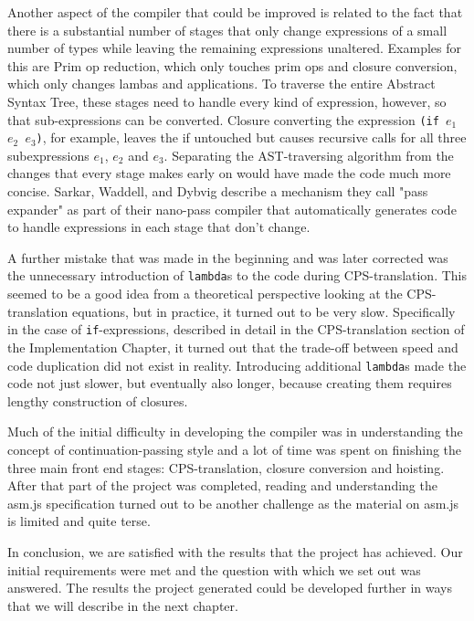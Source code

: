\documentclass[11pt]{report}
\begin{document}
Another aspect of the compiler that could be improved is related to the fact that there is a substantial number of stages that only change expressions of a small number of types while leaving the remaining expressions unaltered. Examples for this are Prim op reduction, which only touches prim ops and closure conversion, which only changes lambas and applications. To traverse the entire Abstract Syntax Tree, these stages need to handle every kind of expression, however, so that sub-expressions can be converted. Closure converting the expression \texttt{(if $e_1$ $e_2$ $e_3$)}, for example, leaves the if untouched but causes recursive calls for all three subexpressions $e_1$, $e_2$ and $e_3$. Separating the AST-traversing algorithm from the changes that every stage makes early on would have made the code much more concise. Sarkar, Waddell, and Dybvig describe \cite{nanopass} a mechanism they call "pass expander" as part of their nano-pass compiler that automatically generates code to handle expressions in each stage that don't change.

A further mistake that was made in the beginning and was later corrected was the unnecessary introduction of \texttt{lambda}s to the code during CPS-translation. This seemed to be a good idea from a theoretical perspective looking at the CPS-translation equations, but in practice, it turned out to be very slow. Specifically in the case of \texttt{if}-expressions, described in detail in the CPS-translation section of the Implementation Chapter, it turned out that the trade-off between speed and code duplication did not exist in reality. Introducing additional \texttt{lambda}s made the code not just slower, but eventually also longer, because creating them requires lengthy construction of closures.

Much of the initial difficulty in developing the compiler was in understanding the concept of continuation-passing style and a lot of time was spent on finishing the three main front end stages: CPS-translation, closure conversion and hoisting. After that part of the project was completed, reading and understanding the asm.js specification turned out to be another challenge as the material on asm.js is limited and quite terse.

In conclusion, we are satisfied with the results that the project has achieved. Our initial requirements were met and the question with which we set out was answered. The results the project generated could be developed further in ways that we will describe in the next chapter.
\end{document}
